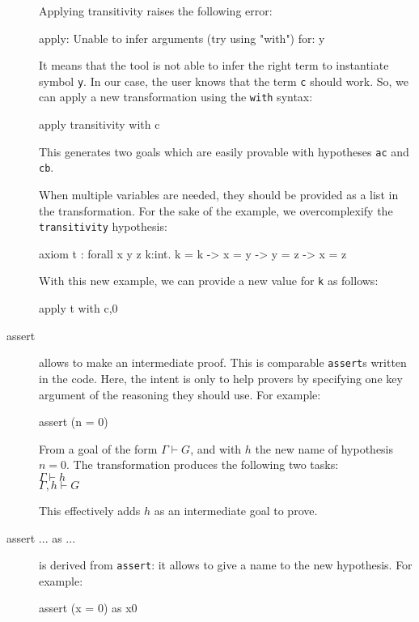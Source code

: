\begin{description}
Applying transitivity raises the following error:

\begin{transwhy3}
apply: Unable to infer arguments (try using "with") for: y
\end{transwhy3}

It means that the tool is not able to infer the right term to
instantiate symbol \texttt{y}. In our case, the user knows that the term
\texttt{c} should work.
So, we can apply a new transformation using the \texttt{with} syntax:

\begin{transwhy3}
apply transitivity with c
\end{transwhy3}

This generates two goals which are easily provable with hypotheses \texttt{ac}
and \texttt{cb}.

When multiple variables are needed, they should be provided as a list in the
transformation. For the sake of the example, we overcomplexify the
\texttt{transitivity} hypothesis:
\begin{whycode}
axiom t : forall x y z k:int. k = k -> x = y -> y = z -> x = z
\end{whycode}
With this new example, we can provide a new value for \texttt{k} as follows:

\begin{transwhy3}
apply t with c,0
\end{transwhy3}

\item[assert] allows to make an intermediate proof. This is comparable
  \texttt{assert}s written in the \whyml code. Here, the intent is only to help
  provers by specifying one key argument of the reasoning they should use.
  For example:

\begin{transwhy3}
assert (n = 0)
\end{transwhy3}

From a goal of the form $\Gamma \vdash G$, and with $h$ the new name of
hypothesis $n = 0$. The transformation produces the following two tasks:\\
$\Gamma \vdash h$\\
$\Gamma, h \vdash G$

This effectively adds $h$ as an intermediate goal to prove.


\item[assert ... as ...] is derived from \texttt{assert}: it allows to give
  a name to the new hypothesis.
  For example:
\begin{transwhy3}
assert (x = 0) as x0
\end{transwhy3}


\end{description}
